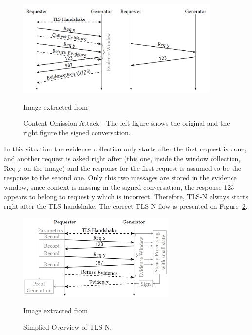 \begin{figure}[h]
    \begin{center}
        \leavevmode
        \includegraphics[width=0.9\textwidth]{figures/tlsn-content-omission.PNG}
        \caption{Content Omission Attack - The left figure shows the original and the right figure the signed conversation.}{Image extracted from \citet{Ritzdorf2017a}}
        \label{fig:/figures/tlsn-content-omission}
    \end{center}
\end{figure}

In this situation the evidence collection only starts after the first request is done, and another request is asked right after (this one, inside the window collection, Req y on the image) and the response for the first request is assumed to be the response to the second one. Only this two messages are stored in the evidence window, since context is missing in the signed conversation, the response 123 appears to belong to request y which is incorrect. Therefore, TLS-N always starts right after the TLS handshake. The correct TLS-N flow is presented on Figure~\ref{fig:/figures/tlsn-normal-flow}.


\begin{figure}[h]
    \begin{center}
        \leavevmode
        \includegraphics[width=0.7\textwidth]{figures/tlsn-normal-flow.PNG}
        \caption{Simplied Overview of TLS-N.}{Image extracted from \citet{Ritzdorf2017a}}
        \label{fig:/figures/tlsn-normal-flow}
    \end{center}
\end{figure}

